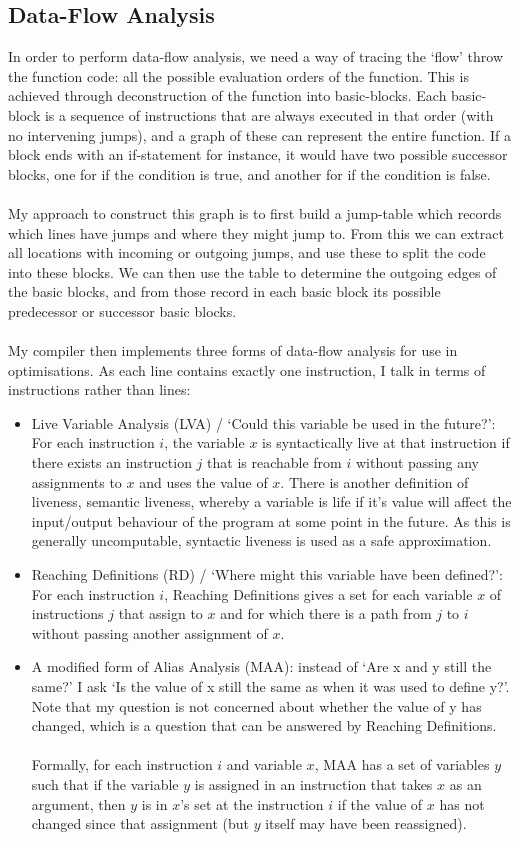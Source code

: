 \subsection{Data-Flow Analysis}
In order to perform data-flow analysis, we need a way of tracing the `flow' throw the function code: all the possible evaluation orders of the function. This is achieved through deconstruction of the function into basic-blocks. Each basic-block is a sequence of instructions that are always executed in that order (with no intervening jumps), and a graph of these can represent the entire function. If a block ends with an if-statement for instance, it would have two possible successor blocks, one for if the condition is true, and another for if the condition is false.
\\\\
My approach to construct this graph is to first build a jump-table which records which lines have jumps and where they might jump to. From this we can extract all locations with incoming or outgoing jumps, and use these to split the code into these blocks. We can then use the table to determine the outgoing edges of the basic blocks, and from those record in each basic block its possible predecessor or successor basic blocks.
\\\\
My compiler then implements three forms of data-flow analysis for use in optimisations. As each line contains exactly one instruction, I talk in terms of instructions rather than lines:
\begin{itemize}
\item Live Variable Analysis (LVA) / `Could this variable be used in the future?': For each instruction $i$, the variable $x$ is syntactically live at that instruction if there exists an instruction $j$ that is reachable from $i$ without passing any assignments to $x$ and uses the value of $x$. There is another definition of liveness, semantic liveness, whereby a variable is life if it's value will affect the input/output behaviour of the program at some point in the future. As this is generally uncomputable, syntactic liveness is used as a safe approximation.
\item Reaching Definitions (RD) / `Where might this variable have been defined?': For each instruction $i$, Reaching Definitions gives a set for each variable $x$ of instructions $j$ that assign to $x$ and for which there is a path from $j$ to $i$ without passing another assignment of $x$.
\item A modified form of Alias Analysis (MAA): instead of `Are x and y still the same?' I ask `Is the value of x still the same as when it was used to define y?'. Note that my question is not concerned about whether the value of y has changed, which is a question that can be answered by Reaching Definitions.
\\\\Formally, for each instruction $i$ and variable $x$, MAA has a set of variables $y$ such that if the variable $y$ is assigned in an instruction that takes $x$ as an argument, then $y$ is in $x$'s set at the instruction $i$ if the value of $x$ has not changed since that assignment (but $y$ itself may have been reassigned).
\end{itemize}

